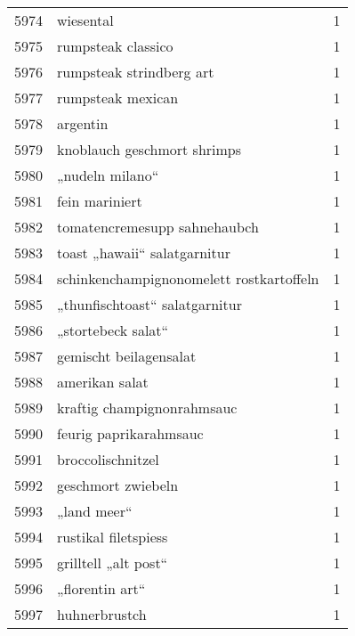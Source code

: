 \begin{tabular}{llr}
5974 &                                          wiesental &      1 \\
5975 &                                 rumpsteak classico &      1 \\
5976 &                           rumpsteak strindberg art &      1 \\
5977 &                                  rumpsteak mexican &      1 \\
5978 &                                           argentin &      1 \\
5979 &                        knoblauch geschmort shrimps &      1 \\
5980 &                                    „nudeln milano“ &      1 \\
5981 &                                     fein mariniert &      1 \\
5982 &                       tomatencremesupp sahnehaubch &      1 \\
5983 &                       toast „hawaii“ salatgarnitur &      1 \\
5984 &           schinkenchampignonomelett rostkartoffeln &      1 \\
5985 &                     „thunfischtoast“ salatgarnitur &      1 \\
5986 &                                 „stortebeck salat“ &      1 \\
5987 &                             gemischt beilagensalat &      1 \\
5988 &                                     amerikan salat &      1 \\
5989 &                         kraftig champignonrahmsauc &      1 \\
5990 &                             feurig paprikarahmsauc &      1 \\
5991 &                                  broccolischnitzel &      1 \\
5992 &                                 geschmort zwiebeln &      1 \\
5993 &                                        „land meer“ &      1 \\
5994 &                               rustikal filetspiess &      1 \\
5995 &                               grilltell „alt post“ &      1 \\
5996 &                                    „florentin art“ &      1 \\
5997 &                                      huhnerbrustch &      1 \\

\end{tabular}
